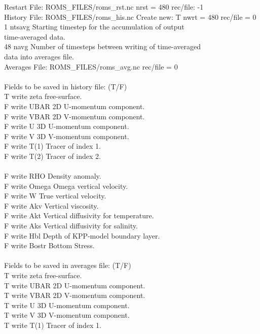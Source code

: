 Restart File:  ROMS\_FILES/roms\_rst.nc    nrst =   480    rec/file:   -1\\
History File:  ROMS\_FILES/roms\_his.nc  Create new: T  nwrt = 480  rec/file =  0\\
1  ntsavg      Starting timestep for the accumulation of output\\
time-averaged data.\\
48  navg        Number of timesteps between writing of time-averaged\\
data into averages file.\\
Averages File:  ROMS\_FILES/roms\_avg.nc rec/file =  0\\
\\
Fields to be saved in history file: (T/F)\\
T  write zeta  free-surface.\\
F  write UBAR  2D U-momentum component.\\
F  write VBAR  2D V-momentum component.\\
F  write U     3D U-momentum component.\\
F  write V     3D V-momentum component.\\
F  write T(1)  Tracer of index 1.\\
F  write T(2)  Tracer of index 2.\\
\\
F  write RHO   Density anomaly.\\
F  write Omega Omega vertical velocity.\\
F  write W     True vertical velocity.\\
F  write Akv   Vertical viscosity.\\
F  write Akt   Vertical diffusivity for temperature.\\
F  write Aks   Vertical diffusivity for salinity.\\
F  write Hbl   Depth of KPP-model boundary layer.\\
F  write Bostr Bottom Stress.\\
\\
Fields to be saved in averages file: (T/F)\\
T  write zeta  free-surface.\\
T  write UBAR  2D U-momentum component.\\
T  write VBAR  2D V-momentum component.\\
T  write U     3D U-momentum component.\\
T  write V     3D V-momentum component.\\
T  write T(1)  Tracer of index 1.\\
